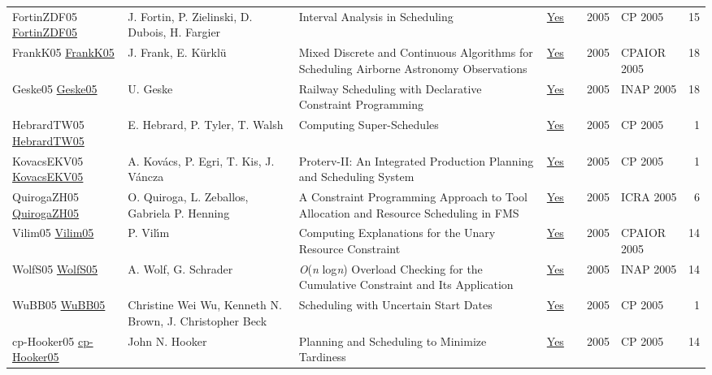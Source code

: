{\begin{longtable}{p{3cm}p{6cm}p{7cm}rrrp{3cm}r}
FortinZDF05 \href{https://doi.org/10.1007/11564751\_19}{FortinZDF05} & J. Fortin, P. Zielinski, D. Dubois, H. Fargier & Interval Analysis in Scheduling & \href{papers/FortinZDF05.pdf}{Yes} & \cite{FortinZDF05} & 2005 & CP 2005 & 15\\
FrankK05 \href{https://doi.org/10.1007/11493853\_15}{FrankK05} & J. Frank, E. K{\"{u}}rkl{\"{u}} & Mixed Discrete and Continuous Algorithms for Scheduling Airborne Astronomy Observations & \href{papers/FrankK05.pdf}{Yes} & \cite{FrankK05} & 2005 & CPAIOR 2005 & 18\\
Geske05 \href{https://doi.org/10.1007/11963578\_10}{Geske05} & U. Geske & Railway Scheduling with Declarative Constraint Programming & \href{papers/Geske05.pdf}{Yes} & \cite{Geske05} & 2005 & INAP 2005 & 18\\
HebrardTW05 \href{https://doi.org/10.1007/11564751\_117}{HebrardTW05} & E. Hebrard, P. Tyler, T. Walsh & Computing Super-Schedules & \href{papers/HebrardTW05.pdf}{Yes} & \cite{HebrardTW05} & 2005 & CP 2005 & 1\\
KovacsEKV05 \href{https://doi.org/10.1007/11564751\_118}{KovacsEKV05} & A. Kov{\'{a}}cs, P. Egri, T. Kis, J. V{\'{a}}ncza & Proterv-II: An Integrated Production Planning and Scheduling System & \href{papers/KovacsEKV05.pdf}{Yes} & \cite{KovacsEKV05} & 2005 & CP 2005 & 1\\
QuirogaZH05 \href{https://doi.org/10.1109/ROBOT.2005.1570686}{QuirogaZH05} & O. Quiroga, L. Zeballos, Gabriela P. Henning & A Constraint Programming Approach to Tool Allocation and Resource Scheduling in {FMS} & \href{papers/QuirogaZH05.pdf}{Yes} & \cite{QuirogaZH05} & 2005 & ICRA 2005 & 6\\
Vilim05 \href{https://doi.org/10.1007/11493853\_29}{Vilim05} & P. Vil{\'{\i}}m & Computing Explanations for the Unary Resource Constraint & \href{papers/Vilim05.pdf}{Yes} & \cite{Vilim05} & 2005 & CPAIOR 2005 & 14\\
WolfS05 \href{https://doi.org/10.1007/11963578\_8}{WolfS05} & A. Wolf, G. Schrader & \emph{O}(\emph{n} log\emph{n}) Overload Checking for the Cumulative Constraint and Its Application & \href{papers/WolfS05.pdf}{Yes} & \cite{WolfS05} & 2005 & INAP 2005 & 14\\
WuBB05 \href{https://doi.org/10.1007/11564751\_110}{WuBB05} & Christine Wei Wu, Kenneth N. Brown, J. Christopher Beck & Scheduling with Uncertain Start Dates & \href{papers/WuBB05.pdf}{Yes} & \cite{WuBB05} & 2005 & CP 2005 & 1\\
cp-Hooker05 \href{https://doi.org/10.1007/11564751\_25}{cp-Hooker05} & John N. Hooker & Planning and Scheduling to Minimize Tardiness & \href{papers/cp-Hooker05.pdf}{Yes} & \cite{cp-Hooker05} & 2005 & CP 2005 & 14\\

\end{longtable}}
